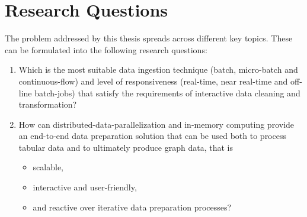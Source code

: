 \section{Research Questions}
\label{sec:reseach-ques}
\noindent The problem addressed by this thesis spreads across different key topics. These can be formulated into the following research questions:
\begin{enumerate}
\item Which is the most suitable data ingestion technique (batch, micro-batch and continuous-flow) and level of responsiveness  (real-time, near real-time and off-line batch-jobs) that satisfy the requirements of interactive data cleaning and transformation?
\item How can distributed-data-parallelization and in-memory computing provide an end-to-end data preparation solution that can be used both to process tabular data and to ultimately produce graph data, that is
\begin{itemize}
\item scalable,
\item interactive and user-friendly,
\item and reactive over iterative data preparation processes?
\end{itemize}
\end{enumerate}

